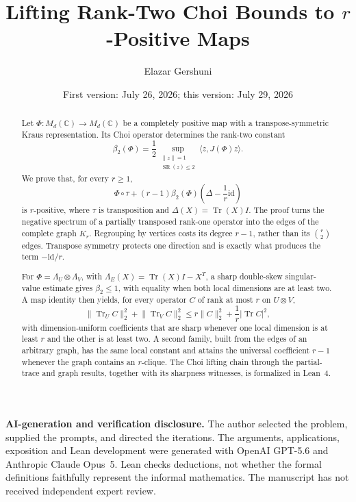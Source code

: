 \documentclass[11pt,reqno]{amsart}
\title[Lifting Rank-Two Choi Bounds to $r$-Positive Maps]
{Lifting Rank-Two Choi Bounds to \(r\)-Positive Maps}
\author{Elazar Gershuni}
\date{First version: July 26, 2026; this version: July 29, 2026}
\theoremstyle{remark}
\DeclareMathOperator{\Tr}{Tr}
\DeclareMathOperator{\SR}{SR}
\newcommand{\id}{\mathrm{id}}
\newcommand{\C}{\mathbb C}
\newcommand{\ip}[2]{\langle #1,#2\rangle}
\newcommand{\norm}[1]{\lVert #1\rVert}
\newcommand{\abs}[1]{\lvert #1\rvert}
\begin{document}
\begin{abstract}
Let $\Phi:M_d(\C)\to M_d(\C)$ be a completely positive map with a
transpose-symmetric Kraus representation.  Its Choi operator determines the
rank-two constant
\[
  \beta_2(\Phi)
  =\frac12\sup_{\substack{\norm z=1\\ \SR(z)\le2}}
       \ip z{J(\Phi)z}.
\]
We prove that, for every $r\ge1$,
\[
  \Phi\circ\tau+(r-1)\beta_2(\Phi)
       \left(\Delta-\frac1r\id\right)
\]
is $r$-positive, where $\tau$ is transposition and
$\Delta(X)=\Tr(X)I$.  The proof turns the negative spectrum of a partially
transposed rank-one operator into the edges of the complete graph $K_r$.
Regrouping by vertices costs its degree $r-1$, rather than its
$\binom r2$ edges.  Transpose symmetry protects one direction and is exactly
what produces the term $-\id/r$.

For $\Phi=\Lambda_U\otimes\Lambda_V$, with
$\Lambda_E(X)=\Tr(X)I-X^T$, a sharp double-skew singular-value estimate gives
$\beta_2\le1$, with equality when both local dimensions are at least two.  A
map identity then yields, for every operator $C$ of rank at most $r$ on
$U\otimes V$,
\[
  \norm{\Tr_U C}_2^2+\norm{\Tr_V C}_2^2
  \le r\norm C_2^2+\frac1r\abs{\Tr C}^2,
\]
with dimension-uniform coefficients that are sharp whenever one local
dimension is at least $r$ and the other is at least two.  A second family,
built from the edges of an arbitrary graph, has the same local constant and
attains the universal coefficient $r-1$ whenever the graph contains an
$r$-clique.  The Choi lifting chain through the partial-trace and graph
results, together with its sharpness witnesses, is formalized in Lean~4.
\end{abstract}

\maketitle

\vspace{-3pt}
\begingroup\footnotesize\noindent
\textbf{AI-generation and verification disclosure.}
The author selected the problem, supplied the prompts, and directed the
iterations.  The arguments, applications, exposition and Lean development
were generated with OpenAI GPT-5.6 and Anthropic Claude Opus~5.
Lean checks deductions, not whether the formal definitions faithfully
represent the informal mathematics.  The manuscript has not received
independent expert review.
\par\endgroup
\end{document}
